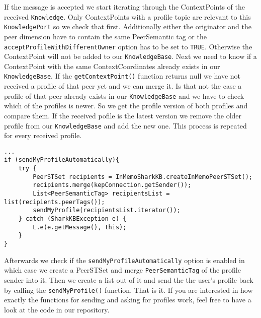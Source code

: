If the message is accepted we start iterating through the ContextPoints of the received {\tt Knowledge}. Only ContextPoints with a profile topic are relevant to this {\tt KnowledgePort} so we check that first. Additionally either the originator and the peer dimension have to contain the same PeerSemantic tag or the {\tt acceptProfileWithDifferentOwner} option has to be set to {\tt TRUE}. Otherwise the ContextPoint will not be added to our {\tt KnowledgeBase}.
Next we need to know if a ContextPoint with the same ContextCoordinates already exists in our {\tt KnowledgeBase}. If the {\tt getContextPoint()} function returns null we have not received a profile of that peer yet and we can merge it. Is that not the case a profile of that peer already exists in our {\tt KnowledgeBase} and we have to check which of the profiles is newer. So we get the profile version of both profiles and compare them. If the received pofile is the latest version we remove the older profile from our {\tt KnowledgeBase} and add the new one. This process is repeated for every received profile.

\begin{verbatim}
...
if (sendMyProfileAutomatically){
	try {
		PeerSTSet recipients = InMemoSharkKB.createInMemoPeerSTSet();
		recipients.merge(kepConnection.getSender());
		List<PeerSemanticTag> recipientsList = list(recipients.peerTags());
		sendMyProfile(recipientsList.iterator());
	} catch (SharkKBException e) {
		L.e(e.getMessage(), this);
	}
}
\end{verbatim}

Afterwards we check if the {\tt sendMyProfileAutomatically} option is enabled in which case we create a PeerSTSet and merge {\tt PeerSemanticTag} of the profile sender into it. Then we create a list out of it and send the the user's profile back by calling the {\tt sendMyProfile()} function.
That is it. If you are interested in how exactly the functions for sending and asking for profiles work, feel free to have a look at the code in our repository.
